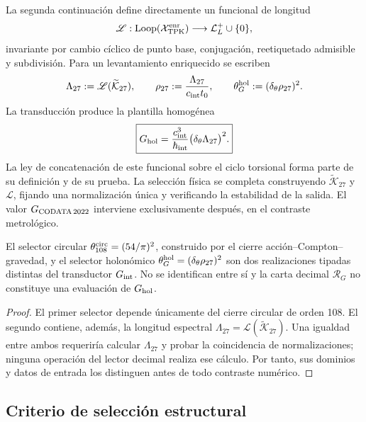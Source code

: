 La segunda continuación define directamente un funcional de longitud
\[
 \mathscr L:
 \operatorname{Loop}(\mathcal X_{\rm TPK}^{\rm enr})
 \longrightarrow\mathcal L_L^+\cup\{0\},
\]
invariante por cambio cíclico de punto base, conjugación, reetiquetado
admisible y subdivisión. Para un levantamiento enriquecido se escriben
\[
 \Lambda_{27}:=\mathscr L(\widetilde{\mathcal K}_{27}),
 \qquad
 \rho_{27}:=\frac{\Lambda_{27}}{c_{\rm int}t_0},
 \qquad
 \theta_G^{\rm hol}:=(\delta_\theta\rho_{27})^2.
\]
La transducción produce la plantilla homogénea
\begin{equation}
 \boxed{
 G_{\rm hol}
 =\frac{c_{\rm int}^{3}}{\hbar_{\rm int}}
  \bigl(\delta_\theta\Lambda_{27}\bigr)^2.}
 \label{eq:plantilla-holonomia-G-rev11}
\end{equation}
La ley de concatenación de este funcional sobre el ciclo torsional forma
parte de su definición y de su prueba. La selección física se completa
construyendo \(\widetilde{\mathcal K}_{27}\) y \(\mathscr L\), fijando una
normalización única y verificando la estabilidad de la salida. El valor
\(G_{\rm CODATA\,2022}\) interviene exclusivamente después, en el contraste
metrológico.

\begin{proposition}
\label{prop:separacion-selectores-G}
El selector circular
\(\theta_{108}^{\rm circ}=(54/\pi)^2\), construido por el cierre
acción--Compton--gravedad, y el selector holonómico
\(\theta_G^{\rm hol}=(\delta_\theta\rho_{27})^2\) son dos realizaciones
tipadas distintas del transductor \(G_{\rm int}\).  No se identifican entre
sí y la carta decimal \(\mathscr R_G\) no constituye una evaluación de
\(G_{\rm hol}\).
\end{proposition}
\begin{proof}
El primer selector depende únicamente del cierre circular de orden 108. El
segundo contiene, además, la longitud espectral
\(\Lambda_{27}=\mathscr L(\widetilde{\mathcal K}_{27})\).  Una igualdad
entre ambos requeriría calcular \(\Lambda_{27}\) y probar la coincidencia de
normalizaciones; ninguna operación del lector decimal realiza ese cálculo.
Por tanto, sus dominios y datos de entrada los distinguen antes de todo
contraste numérico.
\end{proof}

\subsection{Criterio de selección estructural}

